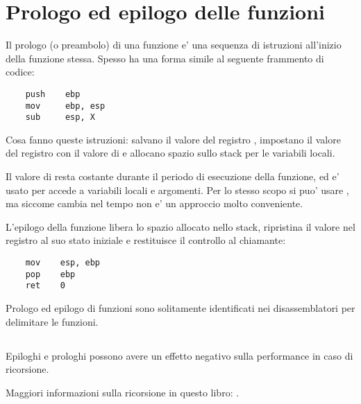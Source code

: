 \chapter{Prologo ed epilogo delle funzioni}
\label{sec:prologepilog}

Il prologo (o preambolo) di una funzione e' una sequenza di istruzioni all'inizio della funzione stessa.
Spesso ha una forma simile al seguente frammento di codice:

\begin{lstlisting}
    push    ebp
    mov     ebp, esp
    sub     esp, X
\end{lstlisting}

Cosa fanno queste istruzioni: salvano il valore del registro \EBP,
impostano il valore del registro \EBP con il valore di \ESP e allocano spazio sullo stack per le variabili locali.

Il valore di \EBP resta costante durante il periodo di esecuzione della funzione, ed e' usato per accede a variabili locali e argomenti.
Per lo stesso scopo si puo' usare \ESP, ma siccome cambia nel tempo non e' un approccio molto conveniente.

L'epilogo della funzione libera lo spazio allocato nello stack, ripristina il valore nel registro \EBP al suo stato iniziale e restituisce
il controllo al \gls{chiamante}:

\begin{lstlisting}
    mov    esp, ebp
    pop    ebp
    ret    0
\end{lstlisting}

Prologo ed epilogo di funzioni sono solitamente identificati nei disassemblatori per delimitare le funzioni.

\section{\Recursion}

\myindex{\Recursion}
Epiloghi e prologhi possono avere un effetto negativo sulla performance in caso di ricorsione.

Maggiori informazioni sulla ricorsione in questo libro: .
